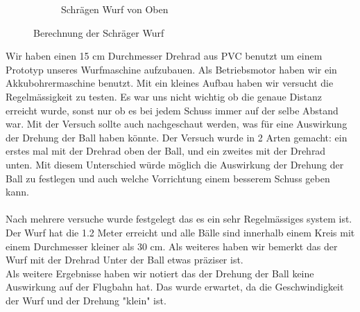 \begin{figure}[h!]
\begin{subfigure}{.4\textwidth}
		\caption{Schrägen Wurf von Oben}
		\label{fig:Drehrad}
	\end{subfigure}
	\caption{Berechnung der Schräger Wurf}
	\label{Drehrad Versuch}
\end{figure}
Wir haben einen 15 cm Durchmesser Drehrad aus PVC benutzt um einem Prototyp unseres Wurfmaschine  aufzubauen. Als Betriebsmotor haben wir ein Akkubohrermaschine benutzt.
Mit ein kleines Aufbau haben wir versucht die Regelmässigkeit zu testen. Es war uns nicht wichtig ob die genaue Distanz erreicht wurde, sonst nur ob es bei jedem Schuss immer auf der selbe Abstand war. Mit der Versuch sollte auch nachgeschaut werden, was für eine Auswirkung der Drehung der Ball haben könnte. Der Versuch wurde in 2 Arten gemacht: ein erstes mal mit der Drehrad oben der Ball, und ein zweites mit der Drehrad unten. Mit diesem Unterschied würde möglich die Auswirkung der Drehung der Ball zu festlegen und auch welche Vorrichtung einem besserem Schuss geben kann.\\ \\
Nach mehrere versuche wurde festgelegt das es ein sehr Regelmässiges system ist. Der Wurf hat die 1.2 Meter erreicht und alle Bälle sind innerhalb einem Kreis mit einem Durchmesser kleiner als 30 cm. Als weiteres haben wir bemerkt das der Wurf mit der Drehrad Unter der Ball etwas präziser ist.\\
Als weitere Ergebnisse haben wir notiert das der Drehung der Ball keine Auswirkung auf der Flugbahn hat. Das wurde erwartet, da die Geschwindigkeit der Wurf und der Drehung "klein" ist. \\


